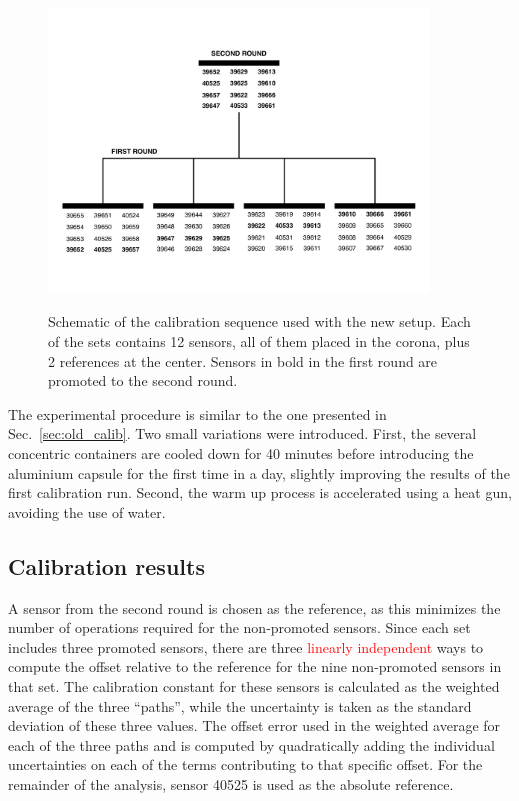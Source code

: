 \label{sec:newCalibrationStrategy}
\begin{figure}[htbp]
\centering
{\includegraphics[width=0.9\textwidth]{images/figure_18.pdf}}
\caption{Schematic of the calibration sequence used with the new setup. Each of the sets contains 12 sensors, all of them placed in the corona, plus 2 references at the center. Sensors in bold in the first round are promoted to the second round.}
\label{fig:newCalibrationStrategy}
\end{figure}

The experimental procedure is similar to the one presented in Sec.~\ref{sec:old_calib}. Two small variations were introduced. First, the several concentric containers are cooled down for 40 minutes before introducing the aluminium capsule for the first time in a day, slightly improving the results of the first calibration run. Second, the warm up process is accelerated using a heat gun, avoiding the use of water.

\subsection{Calibration results}
\label{sec:new_calib_results}

\noindent A sensor from the second round is chosen as the reference, as this minimizes the number of operations required for the non-promoted sensors. Since each set includes three promoted sensors, there are three \textcolor{red}{linearly independent} ways to compute the offset relative to the reference for the nine non-promoted sensors in that set. The calibration constant for these sensors is calculated as the weighted average of the three ``paths'', while the uncertainty is taken as the standard deviation of these three values. The offset error used in the weighted average for each of the three paths and is computed by quadratically adding the individual uncertainties on each of the terms contributing to that specific offset. For the remainder of the analysis, sensor 40525 is used as the absolute reference.


